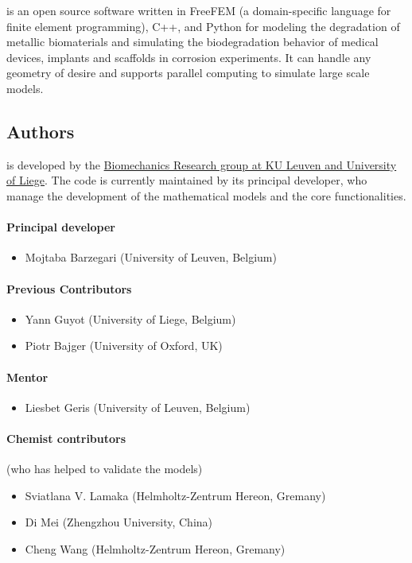 \biodeg{} is an open source software written in FreeFEM (a domain-specific language for finite element programming), C++, and Python for modeling the degradation of metallic biomaterials and simulating the biodegradation behavior of medical devices, implants and scaffolds in corrosion experiments. It can handle any geometry of desire and supports parallel computing to simulate large scale models.

\subsection{Authors}
\label{sec:authors}
\biodeg{} is developed by the \href{http://www.biomech.ulg.ac.be/}{Biomechanics Research group at KU Leuven and University of Liege}. The code is currently maintained by its principal developer, 
who manage the development of the mathematical models and the core functionalities. 

\paragraph*{Principal developer}
\begin{itemize}
	\item Mojtaba Barzegari (University of Leuven, Belgium)
\end{itemize}

\paragraph*{Previous Contributors}
\begin{itemize}
	\item Yann Guyot (University of Liege, Belgium)
	\item Piotr Bajger (University of Oxford, UK)
\end{itemize}

\paragraph*{Mentor}
\begin{itemize}
	\item Liesbet Geris (University of Leuven, Belgium)
\end{itemize}

\paragraph*{Chemist contributors}
(who has helped to validate the models)
\begin{itemize}
	\item Sviatlana V. Lamaka (Helmholtz-Zentrum Hereon, Gremany)
	\item Di Mei (Zhengzhou University, China)
	\item Cheng Wang (Helmholtz-Zentrum Hereon, Gremany)
\end{itemize}

